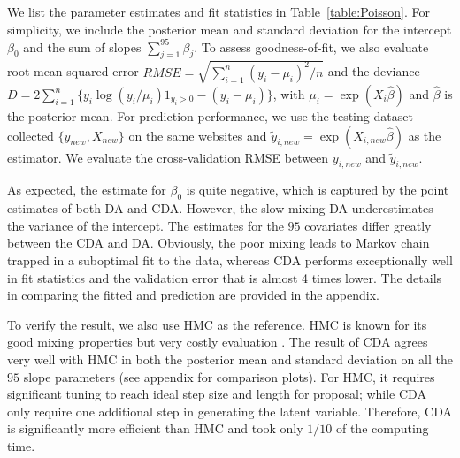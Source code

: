 \documentclass[10pt]{article}
\begin{document}
We list the parameter estimates and fit statistics in Table~\ref{table:Poisson}. For simplicity, we include the posterior mean and standard deviation for the intercept $\beta_0$ and the sum of slopes $\sum_{j=1}^{95} \beta_j$. To assess goodness-of-fit, we also evaluate root-mean-squared error $RMSE= \sqrt{ \sum_{i=1}^n  (y_i-\mu_i)^2/n}$ and the deviance $D=2\sum_{i=1}^n \{ y_i \log(y_i/\mu_i)  1_{y_i>0} -(y_i-\mu_i)\}$, with $\mu_i=\exp( X_i{\hat\beta})$ and ${\hat\beta}$ is the posterior mean. For prediction performance, we use the testing dataset collected $\{ y_{new},  X_{new}\}$ on the same websites and $\tilde y_{i,new}=\exp( X_{i,new}{\hat\beta})$ as the estimator. We evaluate the cross-validation RMSE between $y_{i,new}$ and $\tilde y_{i,new}$.

As expected, the estimate for $\beta_0$ is quite negative, which is captured by the point estimates of both DA and CDA. However, the slow mixing DA underestimates the variance of the intercept. The estimates for the $95$ covariates differ greatly between the CDA and DA. Obviously, the poor mixing leads to Markov chain trapped in a suboptimal fit to the data, whereas CDA performs exceptionally well in fit statistics and the validation error that is almost 4 times lower. The details in comparing the fitted and prediction are provided in the appendix.

To verify the result, we also use HMC as the reference. HMC is known for its good mixing properties but very costly evaluation . The result of CDA agrees very well with HMC in both the posterior mean and standard deviation on all the $95$ slope parameters (see appendix for comparison plots). For HMC, it requires significant tuning to reach ideal step size and length for proposal; while CDA only require one additional  step in generating the latent variable. Therefore, CDA is significantly more efficient than HMC and took only $1/10$ of the computing time.
\end{document}
